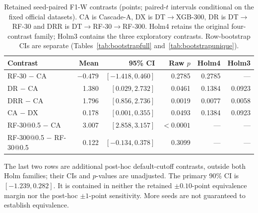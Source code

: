 \begin{table}[!htbp]
\centering
\caption{Retained seed-paired F1-W contrasts (points; paired-$t$ intervals conditional on the fixed official datasets). CA is Cascade-A, DX is DT$\to$XGB-300, DR is DT$\to$RF-30 and DRR is DT$\to$RF-30$\to$RF-300. Holm4 retains the original four-contrast family; Holm3 contains the three exploratory contrasts. Row-bootstrap CIs are separate (Tables~\ref{tab:bootstrapfull} and~\ref{tab:bootstrapunique}).}
\label{tab:paired}
\small
\setlength{\tabcolsep}{4pt}
\begin{tabularx}{\textwidth}{@{}Xrrrrr@{}}
\toprule
Contrast & Mean & 95\% CI & Raw $p$ & Holm4 & Holm3 \\
\midrule
RF-30 $-$ CA & \ensuremath{-0.479} & $[-1.418,0.460]$ & 0.2785 & 0.2785 & --- \\
DR $-$ CA & 1.380 & $[0.029,2.732]$ & 0.0461 & 0.1384 & 0.0923 \\
DRR $-$ CA & 1.796 & $[0.856,2.736]$ & 0.0019 & 0.0077 & 0.0058 \\
CA $-$ DX & 0.178 & $[0.001,0.355]$ & 0.0493 & 0.1384 & 0.0923 \\
\midrule
RF-30@0.5 $-$ CA & 3.007 & $[2.858,3.157]$ & $<0.0001$ & --- & --- \\
RF-300@0.5 $-$ RF-30@0.5 & 0.122 & $[-0.134,0.378]$ & 0.3099 & --- & --- \\
\bottomrule
\end{tabularx}
\par\smallskip
\begin{minipage}{\textwidth}\footnotesize The last two rows are additional post-hoc default-cutoff contrasts, outside both Holm families; their CIs and $p$-values are unadjusted. The primary 90\% CI is $[-1.239,0.282]$. It is contained in neither the retained $\pm0.10$-point equivalence margin nor the post-hoc $\pm1$-point sensitivity. More seeds are not guaranteed to establish equivalence.\end{minipage}
\end{table}
